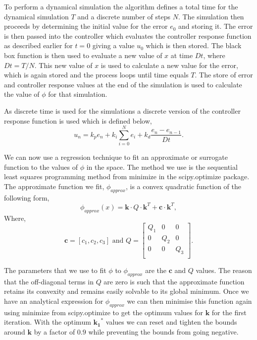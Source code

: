 \documentclass[conference]{IEEEtran}
\theoremstyle{definition}
\begin{document}
To perform a dynamical simulation the algorithm defines a total time for the dynamical simulation $T$ and a discrete number of steps $N$. The simulation then proceeds by determining the initial value for the error $e_0$ and storing it. The error is then passed into the controller which evaluates the controller response function as described earlier for $t=0$ giving a value $u_0$ which is then stored. The black box function is then used to evaluate a new value of $x$ at time $Dt$, where $Dt = T/N$. This new value of $x$ is used to calculate a new value for the error, which is again stored and the process loops until time equals $T$. The store of error and controller response values at the end of the simulation is used to calculate the value of $\phi$ for that simulation.

\noindent As discrete time is used for the simulations a discrete version of the controller response function is used which is defined below,
\begin{equation}
    u_n = k_p e_n + k_i \sum_{i=0}^{N}e_i + k_d \frac{e_n - e_{n-1}}{Dt}.
\end{equation}

\noindent We can now use a regression technique to fit an approximate or surrogate function to the values of $\phi$ in the space. The method we use is the sequential least squares programming method from minimize in the scipy.optimize package. The approximate function we fit, $\phi_{approx}$, is a convex quadratic function of the following form,
\begin{equation}
    \phi_{approx}(x) = \mathbf{k} \cdot Q \cdot \mathbf{k}^T + \mathbf{c} \cdot \mathbf{k}^T,
\end{equation}
Where,
\begin{equation}
    \mathbf{c} = [c_1, c_2, c_3] \textrm{ and } Q = \begin{bmatrix}
                                                    Q_1 & 0 & 0 \\
                                                    0 & Q_2 & 0 \\
                                                    0 & 0 & Q_3 \\
                                                    \end{bmatrix}.
\end{equation}

\noindent The parameters that we use to fit $\phi$ to $\phi_{approx}$ are the $\mathbf{c}$ and $Q$ values. The reason that the off-diagonal terms in $Q$ are zero is such that the approximate function retains its convexity and remains easily solvable to its global minimum. Once we have an analytical expression for $\phi_{approx}$ we can then minimise this function again using minimize from scipy.optimize to get the optimum values for $\mathbf{k}$  for the first iteration. With the optimum $\mathbf{k_1}^*$ values we can reset and tighten the bounds around $\mathbf{k}$ by a factor of $0.9$ while preventing the bounds from going negative. 
\end{document}
